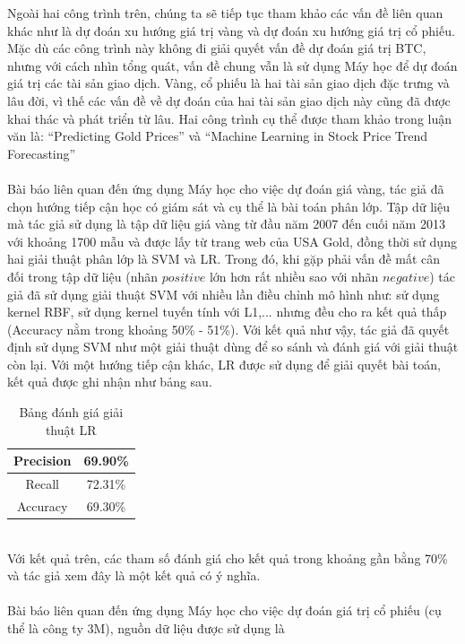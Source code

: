 Ngoài hai công trình trên, chúng ta sẽ tiếp tục tham khảo các vấn đề liên quan 
khác như là dự đoán xu hướng giá trị vàng và dự đoán xu hướng giá trị cổ phiếu.
Mặc dù các công trình này không đi giải quyết vấn đề dự đoán giá trị BTC, nhưng 
với cách nhìn tổng quát, vấn đề chung vẫn là sử dụng Máy học để dự đoán giá trị 
các tài sản giao dịch. Vàng, cổ phiếu là hai tài sản giao dịch đặc trưng và lâu 
đời, vì thế các vấn đề về dự đoán của hai tài sản giao dịch này cũng đã được 
khai thác và phát triển từ lâu. Hai công trình cụ thể được tham khảo trong luận văn là: 
``Predicting Gold Prices'' \cite{PredictingGoldPrices} và 
``Machine Learning in Stock Price Trend Forecasting'' 
\cite{StockPriceTrendForecasting} \\\\ 
Bài báo \cite{PredictingGoldPrices} liên quan đến ứng dụng Máy học cho việc dự đoán 
giá vàng, tác giả đã chọn hướng tiếp cận học có giám sát và cụ thể là bài toán 
phân lớp. Tập dữ liệu mà tác giả sử dụng là tập dữ liệu giá vàng từ đầu năm 2007 
đến cuối năm 2013 với khoảng 1700 mẫu và được lấy từ trang web của USA Gold, 
đồng thời sử dụng hai giải thuật phân lớp là SVM và LR.
Trong đó, khi gặp phải vấn đề mất cân đối trong tập dữ liệu (nhãn $positive$ 
lớn hơn rất nhiều sao với nhãn $negative$) tác giả đã sử dụng giải thuật SVM 
với nhiều lần điều chỉnh mô hình như: sử dụng kernel RBF, sử dụng kernel tuyến 
tính với L1,... nhưng đều cho ra kết quả thấp (Accuracy nằm trong khoảng 50\% 
- 51\%). Với kết quả như vậy, tác giả đã quyết định sử dụng SVM như một giải 
thuật dùng để so sánh và đánh giá với giải thuật còn lại. Với một hướng tiếp 
cận khác, LR được sử dụng để giải quyết bài toán, kết quả được ghi nhận như 
bảng sau.
\begin{table}[h]
\centering
\begin{tabular}{ |c|c| }
\hline
Precision & 69.90\% \\
\hline
Recall & 72.31\% \\
\hline
Accuracy & 69.30\% \\
\hline
\end{tabular}
\caption{Bảng đánh giá giải thuật LR}
\end{table}\\
Với kết quả trên, các tham số đánh giá cho kết quả trong khoảng gần bằng 70\% 
và tác giả xem đây là một kết quả có ý nghĩa.\\\\
Bài báo \cite{StockPriceTrendForecasting} liên quan đến ứng dụng Máy học cho việc 
dự đoán giá trị cổ phiếu (cụ thể là công ty 3M), nguồn dữ liệu được sử dụng là 
